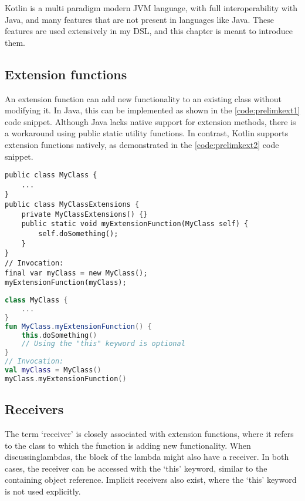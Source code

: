 Kotlin is a multi paradigm modern JVM language, with full interoperability with Java, and many features that are not present in languages like Java. These features are used extensively in my DSL, and this chapter is meant to introduce them.

\subsection{Extension functions}
\label{sec:extension}

An extension function can add new functionality to an existing class without modifying it\cite{KExt}. In Java, this can be implemented as shown in the \ref{code:prelimkext1} code snippet. Although Java lacks native support for extension methods, there is a workaround using public static utility functions. In contrast, Kotlin supports extension functions natively, as demonstrated in the \ref{code:prelimkext2} code snippet.

\begin{lstlisting}[caption={Extension functions in Java},language=Java11,label=code:prelimkext1]
public class MyClass {
    ...
}
public class MyClassExtensions {
    private MyClassExtensions() {}
    public static void myExtensionFunction(MyClass self) {
        self.doSomething();
    }
}
// Invocation:
final var myClass = new MyClass();
myExtensionFunction(myClass);
\end{lstlisting}

\begin{lstlisting}[caption={Extension functions in Kotlin},language=Kotlin,label=code:prelimkext2]
class MyClass {
    ...
}
fun MyClass.myExtensionFunction() {
    this.doSomething()
    // Using the "this" keyword is optional
}
// Invocation:
val myClass = MyClass()
myClass.myExtensionFunction()
\end{lstlisting}

\subsection{Receivers}

The term `receiver' is closely associated with extension functions, where it refers to the class to which the function is adding new functionality. When discussinglambdas, the block of the lambda might also have a receiver. In both cases, the receiver can be accessed with the `this' keyword, similar to the containing object reference. Implicit receivers also exist, where the `this' keyword is not used explicitly.

